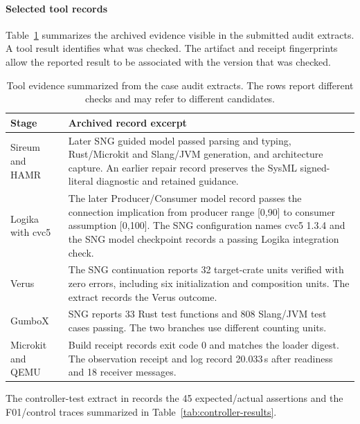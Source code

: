 \paragraph{Selected tool records}
Table~\ref{tab:tool-evidence-extracts} summarizes the archived evidence visible in the submitted audit extracts. A tool result identifies what was checked. The artifact and receipt fingerprints allow the reported result to be associated with the version that was checked.

\begin{table}[!htbp]
\caption{Tool evidence summarized from the case audit extracts. The rows report different checks and may refer to different candidates.}
\label{tab:tool-evidence-extracts}
\centering\small
\begin{tabular}{@{}>{\raggedright\arraybackslash}p{.22\linewidth}>{\raggedright\arraybackslash}p{.72\linewidth}@{}}
\toprule
Stage & Archived record excerpt \\
\midrule
Sireum and HAMR & Later SNG guided model passed parsing and typing, Rust/Microkit and Slang/JVM generation, and architecture capture. An earlier repair record preserves the SysML signed-literal diagnostic and retained guidance. \\
Logika with cvc5 & The later Producer/Consumer model record passes the connection implication from producer range [0,90] to consumer assumption [0,100]. The SNG configuration names cvc5 1.3.4 and the SNG model checkpoint records a passing Logika integration check. \\
Verus & The SNG continuation reports 32 target-crate units verified with zero errors, including six initialization and composition units. The extract records the Verus outcome. \\
GumboX & SNG reports 33 Rust test functions and 808 Slang/JVM test cases passing. The two branches use different counting units. \\
Microkit and QEMU & Build receipt records exit code 0 and matches the loader digest. The observation receipt and log record 20.033\,s after readiness and 18 receiver messages. \\
\bottomrule
\end{tabular}
\end{table}

The controller-test extract in  records the 45 expected/actual assertions and the F01/control traces summarized in Table~\ref{tab:controller-results}.


